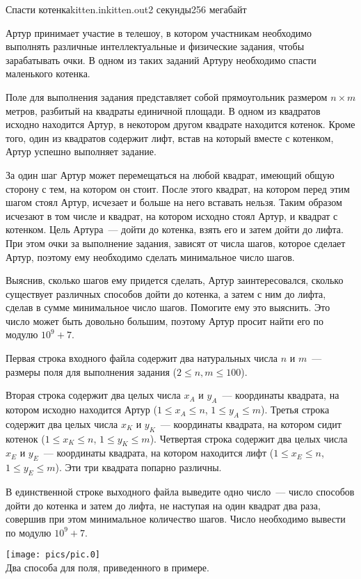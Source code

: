 \begin{problem}{Спасти котенка}{kitten.in}{kitten.out}{2 секунды}{256 мегабайт}


Артур принимает участие в телешоу, в котором участникам необходимо выполнять различные
интеллектуальные и физические задания, чтобы зарабатывать очки. В одном из таких заданий
Артуру необходимо спасти маленького котенка.

Поле для выполнения задания представляет собой прямоугольник размером $n \times m$ метров, 
разбитый на квадраты единичной площади. В одном из квадратов исходно находится Артур, в некотором
другом квадрате находится котенок. Кроме того, один из квадратов содержит лифт, встав на который
вместе с котенком, Артур успешно выполняет задание. 

За один шаг Артур может перемещаться на любой квадрат, имеющий общую сторону с тем, 
на котором он стоит. После этого квадрат, на котором перед этим шагом стоял Артур, исчезает и больше
на него вставать нельзя. Таким образом исчезают в том числе и квадрат, на котором исходно 
стоял Артур, и квадрат с котенком.
Цель Артура~--- дойти до котенка, взять его и затем дойти до 
лифта. При этом очки за выполнение задания, зависят от числа шагов, которое
сделает Артур, поэтому ему необходимо сделать минимальное число шагов.

Выяснив, сколько шагов ему придется сделать, Артур заинтересовался, 
сколько существует различных способов дойти до котенка, а затем с ним
до лифта, сделав в сумме минимальное число шагов.
Помогите ему это выяснить.
Это число может быть довольно большим, поэтому Артур просит найти его
по модулю $10^9+7$.

\InputFile
Первая строка входного файла содержит два натуральных числа $n$ и $m$~--- размеры поля
для выполнения задания ($2 \le n, m \le 100$). 

Вторая строка содержит два целых числа $x_A$ и $y_A$~--- координаты квадрата, на котором
исходно находится Артур ($1 \le x_A \le n$, $1 \le y_A \le m$).
Третья строка содержит два целых числа $x_K$ и $y_K$~--- координаты квадрата, на котором
сидит котенок ($1 \le x_K \le n$, $1 \le y_K \le m$).
Четвертая строка содержит два целых числа $x_E$ и $y_E$~--- координаты квадрата, на котором
находится лифт ($1 \le x_E \le n$, $1 \le y_E \le m$).                
Эти три квадрата попарно различны.


\OutputFile
В единственной строке выходного файла выведите одно число~--- число способов дойти
до котенка и затем до лифта, не наступая на один квадрат два раза, совершив
при этом минимальное количество шагов.
Число необходимо вывести по модулю $10^9+7$.

\Example

\begin{example}%
%
\end{example}

\begin{center}
	\texttt{[image: pics/pic.0]}\\
	Два способа для поля, приведенного в примере.
\end{center}

\end{problem}
